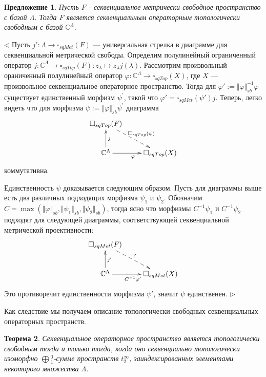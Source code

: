 \documentclass[12pt]{article}
\newtheorem{theorem}{Теорема}[subsection]
\newtheorem{proposition}[theorem]{Предложение}
\newenvironment{proof}{\par $\triangleleft$}{$\triangleright$}
\begin{document}
\begin{proposition}\label{PrMetrFrIsTopFr} Пусть $F$ -  секвенциальное метрически свободное пространство с базой $\Lambda$. Тогда $F$ является секвенциальным  операторным топологически свободным с базой $\mathbb{C}^{\Lambda}$.
\end{proposition}
\begin{proof} Пусть $j':\Lambda\to \square_{sqMet}(F)$ --- универсальная стрелка в диаграмме для секвенциальной метрической свободы. Определим полулинейный ограниченный оператор $j: \mathbb{C}^{\Lambda} \to \square_{sqTop}(F): z_\lambda\mapsto z_\lambda j(\lambda)$. Рассмотрим произвольный ораниченный полулинейный оператор $\varphi : \mathbb{C}^{\Lambda} \to \square_{sqTop}(X)$, где $X$ --- произвольное секвенциальное операторное пространство.  Тогда для $\varphi':=\Vert \varphi \Vert_{sb}^{-1}\varphi $ существует единственный морфизм $\psi^{'}$, такой что $\varphi'=\square_{sqMet}(\psi')j$. Теперь, легко видеть что для морфизма $\psi:=\Vert \varphi \Vert_{sb} \psi^{'}$ диаграмма
$$
\xymatrix{
{\square_{sqTop}(F)}\ar@{-->}[dr]^{\square_{sqTop}(\psi)} & \\
{\mathbb{C}^{\Lambda}}\ar[u]_{j}\ar[r]_{\varphi}  &{\square_{sqTop}(X)} }
$$
коммутативна.
	
Единственность $\psi$ доказывается следующим образом. Пусть для диаграммы выше есть два различных подходящих морфизма $\psi_1$ и $\psi_2$. Обозначим $C=\max( \Vert \varphi\Vert_{sb}, \Vert \psi_1 \Vert_{sb}, \Vert \psi_2\Vert_{sb})$, тогда ясно что морфизмы $C^{-1}\psi_1$ и $C^{-1}\psi_2$ подходят для следующей диаграммы, соответствующей секвенциальной метрической проективности:
$$
\xymatrix{
{\square_{sqMet}(F)}\ar@{-->}[dr]^{?} & \\
{\mathbb{C}^\Lambda}\ar[u]_{j'}\ar[r]_{ C^{-1}\varphi'}  &{\square_{sqMet}(X)} }
$$
Это противоречит единственности морфизма $\psi'$, значит $\psi$ единственен.
\end{proof}

Как следствие мы получаем описание топологически свободных секвенциальных операторных пространств.

\begin{theorem}\label{ThTopFrDesc} 
Секвенциальное операторное пространство является топологически свободным тогда и только тогда, когда оно секвенциально топологически изоморфно $\bigoplus{}_1^0$-сумме пространств $t_2^\infty$, заиндексированных 
элементами некоторого множества $\Lambda$.
\end{theorem}
\end{document}
